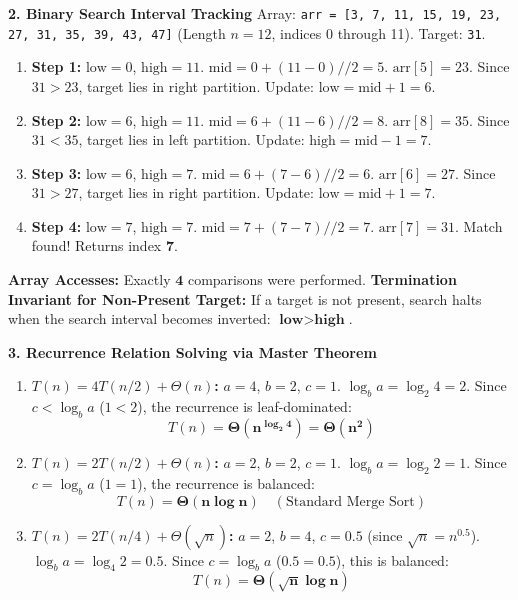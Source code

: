 \textbf{2. Binary Search Interval Tracking}
Array: \texttt{arr = [3, 7, 11, 15, 19, 23, 27, 31, 35, 39, 43, 47]} (Length $n = 12$, indices 0 through 11). Target: \texttt{31}.
\begin{enumerate}
    \item \textbf{Step 1:} $\text{low} = 0$, $\text{high} = 11$.
    $\text{mid} = 0 + (11 - 0) // 2 = 5$.
    $\text{arr}[5] = 23$. Since $31 > 23$, target lies in right partition.
    Update: $\text{low} = \text{mid} + 1 = 6$.
    \item \textbf{Step 2:} $\text{low} = 6$, $\text{high} = 11$.
    $\text{mid} = 6 + (11 - 6) // 2 = 8$.
    $\text{arr}[8] = 35$. Since $31 < 35$, target lies in left partition.
    Update: $\text{high} = \text{mid} - 1 = 7$.
    \item \textbf{Step 3:} $\text{low} = 6$, $\text{high} = 7$.
    $\text{mid} = 6 + (7 - 6) // 2 = 6$.
    $\text{arr}[6] = 27$. Since $31 > 27$, target lies in right partition.
    Update: $\text{low} = \text{mid} + 1 = 7$.
    \item \textbf{Step 4:} $\text{low} = 7$, $\text{high} = 7$.
    $\text{mid} = 7 + (7 - 7) // 2 = 7$.
    $\text{arr}[7] = 31$. Match found! Returns index $\mathbf{7}$.
\end{enumerate}
\textbf{Array Accesses:} Exactly $\mathbf{4}$ comparisons were performed.
\textbf{Termination Invariant for Non-Present Target:}
If a target is not present, search halts when the search interval becomes inverted: $\mathbf{\text{low} > \text{high}}$.

\textbf{3. Recurrence Relation Solving via Master Theorem}
\begin{enumerate}
    \item \textbf{$T(n) = 4 T(n/2) + \Theta(n)$:}
    $a = 4$, $b = 2$, $c = 1$.
    $\log_b a = \log_2 4 = 2$.
    Since $c < \log_b a$ ($1 < 2$), the recurrence is leaf-dominated:
    \begin{equation*}
    T(n) = \mathbf{\Theta(n^{\log_2 4}) = \Theta(n^2)}
    \end{equation*}
    \item \textbf{$T(n) = 2 T(n/2) + \Theta(n)$:}
    $a = 2$, $b = 2$, $c = 1$.
    $\log_b a = \log_2 2 = 1$.
    Since $c = \log_b a$ ($1 = 1$), the recurrence is balanced:
    \begin{equation*}
    T(n) = \mathbf{\Theta(n \log n)} \quad (\text{Standard Merge Sort})
    \end{equation*}
    \item \textbf{$T(n) = 2 T(n/4) + \Theta(\sqrt{n})$:}
    $a = 2$, $b = 4$, $c = 0.5$ (since $\sqrt{n} = n^{0.5}$).
    $\log_b a = \log_4 2 = 0.5$.
    Since $c = \log_b a$ ($0.5 = 0.5$), this is balanced:
    \begin{equation*}
    T(n) = \mathbf{\Theta(\sqrt{n} \log n)}
    \end{equation*}
\end{enumerate}

